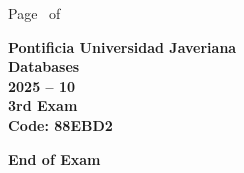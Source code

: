 \documentclass[11pt, addpoints, answers]{exam}\usepackage[utf8]{inputenc}
\begin{document}
\begin{coverpages}
\begin{center}
			\vspace{3mm}
			\leavevmode \hspace{5mm} 
		\end{center}
	\end{coverpages}

	\footer{} {Page \thepage\ of \numpages} {}

	\centering
	\textbf{\Large Pontificia Universidad Javeriana}\\
	\textbf{\Large Databases} \\
	\textbf{\large 2025 -- 10} \\
	\textbf{\large 3rd Exam} \\
	\textbf{Code: 88EBD2}


	\begin{questions}
		
		
		
		
		
		
		
		
		
		
		
		
		
		
		
		
		
		
		
		
	\end{questions}

	\vspace{5mm}
	\noindent \textbf{End of Exam}
\end{document}
